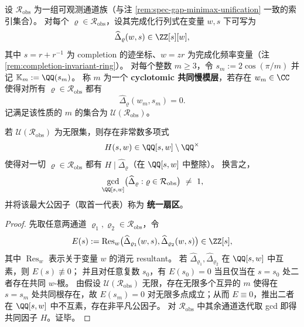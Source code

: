 \begin{definition}\label{def:cyclotomic-common-slowmode-layer}
设 \(\mathcal{R}_{\mathrm{obs}}\) 为一组可观测通道族（与注 \ref{rem:spec-gap-minimax-unification} 一致的索引集合）。
对每个 \(\varrho\in\mathcal{R}_{\mathrm{obs}}\)，设其完成化行列式在变量 \(w,s\) 下可写为
\[
\widehat{\Delta}_{\varrho}(w,s)\in\ZZ[s][w],
\]
其中 \(s=r+r^{-1}\) 为 completion 的迹坐标、\(w=zr\) 为完成化频率变量（注 \ref{rem:completion-invariant-ring}）。
对每个整数 \(m\ge 3\)，令 \(s_m:=2\cos(\pi/m)\) 并记 \(\mathbb{K}_m:=\QQ(s_m)\)。
称 \(m\) 为一个 \textbf{cyclotomic 共同慢模层}，若存在 \(w_m\in\CC\) 使得对所有 \(\varrho\in\mathcal{R}_{\mathrm{obs}}\) 都有
\[
\widehat{\Delta}_{\varrho}(w_m,s_m)=0.
\]
记满足该性质的 \(m\) 的集合为 \(\mathcal{U}(\mathcal{R}_{\mathrm{obs}})\)。
\end{definition}

\begin{theorem}[循环特化刚性：无限多层共同慢模 \texorpdfstring{$\Rightarrow$}{=>} 统一扇区存在]\label{thm:cyclotomic-specialization-rigidity}
若 \(\mathcal{U}(\mathcal{R}_{\mathrm{obs}})\) 为无限集，则存在非常数多项式
\[
H(s,w)\in \QQ[s,w]\setminus\QQ^\times
\]
使得对一切 \(\varrho\in\mathcal{R}_{\mathrm{obs}}\) 都有 \(H\mid \widehat{\Delta}_{\varrho}\)（在 \(\QQ[s,w]\) 中整除）。
换言之，
\[
\gcd_{\QQ[s,w]}\bigl(\widehat{\Delta}_{\varrho}:\varrho\in\mathcal{R}_{\mathrm{obs}}\bigr)\ \neq\ 1,
\]
并将该最大公因子（取首一代表）称为 \textbf{统一扇区}。
\end{theorem}
\begin{proof}
先取任意两通道 \(\varrho_1,\varrho_2\in\mathcal{R}_{\mathrm{obs}}\)，令
\[
E(s):=\operatorname{Res}_{w}\bigl(\widehat{\Delta}_{\varrho_1}(w,s),\widehat{\Delta}_{\varrho_2}(w,s)\bigr)\in\ZZ[s],
\]
其中 \(\operatorname{Res}_{w}\) 表示关于变量 \(w\) 的消元 resultant。
若 \(\widehat{\Delta}_{\varrho_1},\widehat{\Delta}_{\varrho_2}\) 在 \(\QQ[s,w]\) 中互素，则 \(E(s)\not\equiv 0\)；
并且对任意复数 \(s_0\)，有 \(E(s_0)=0\) 当且仅当在 \(s=s_0\) 处二者存在共同 \(w\)-根。
由假设 \(\mathcal{U}(\mathcal{R}_{\mathrm{obs}})\) 无限，存在无限多个互异的 \(m\) 使得在 \(s=s_m\) 处共同根存在，故 \(E(s_m)=0\) 对无限多点成立；从而 \(E\equiv 0\)，推出二者在 \(\QQ[s,w]\) 中不互素，存在非平凡公因子。
对 \(\mathcal{R}_{\mathrm{obs}}\) 中其余通道迭代取 gcd 即得共同因子 \(H\)。证毕。
\end{proof}


